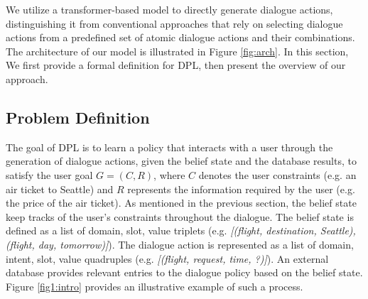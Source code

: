\documentclass[letterpaper]{article} %
\begin{document}
We utilize a transformer-based model to directly generate dialogue actions, distinguishing it from conventional approaches that rely on selecting dialogue actions from a predefined set of atomic dialogue actions and their combinations. The architecture of our model is illustrated in Figure \ref{fig:arch}. In this section, We first provide a formal definition for DPL, then present the overview of our approach.

\subsection{Problem Definition}
The goal of DPL is to learn a policy that interacts with a user through the generation of dialogue actions, given the belief state and the database results, to satisfy the user goal $G=(C, R)$, where $C$ denotes the user constraints (e.g. an air ticket to Seattle) and $R$ represents the information required by the user (e.g. the price of the air ticket).  As mentioned in the previous section, the belief state keep tracks of the user's constraints throughout the dialogue. 
The belief state is defined as a list of domain, slot, value triplets (e.g. \textit{[(flight, destination, Seattle), (flight, day, tomorrow)]}).
The dialogue action is represented as a list of domain, intent, slot, value quadruples (e.g. \textit{[(flight, request, time, ?)]}).
An external database provides relevant entries to the dialogue policy based on the belief state. Figure \ref{fig1:intro} provides an illustrative example of such a process.
\end{document}
